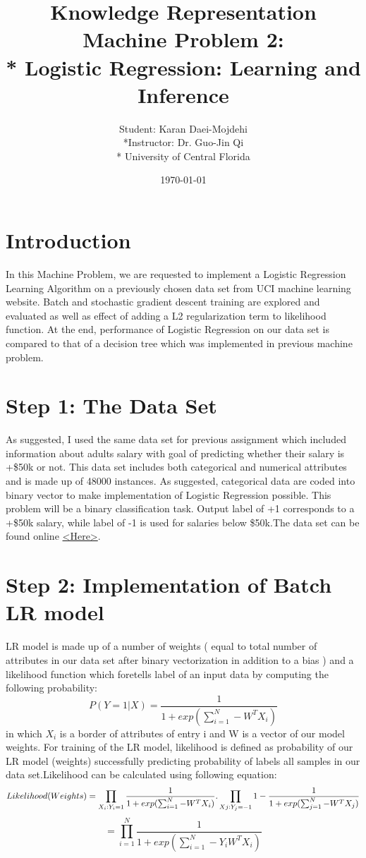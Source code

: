 \documentclass[a4paper,11pt]{article}
\author{Student: Karan Daei-Mojdehi\\*Instructor: Dr. Guo-Jin Qi\\* University of Central Florida}
\title{Knowledge Representation Machine Problem 2:\\* Logistic Regression: Learning and Inference }
\date{\today}
\begin{document}
\maketitle


\section*{Introduction}
In this Machine Problem, we are requested to implement a Logistic Regression Learning Algorithm on a previously chosen data set from UCI machine learning website. Batch and stochastic gradient descent training are explored and evaluated as well as effect of adding a L2 regularization term to likelihood function. At the end, performance of Logistic Regression on our data set is compared to that of a decision tree which was implemented in previous machine problem.

\section*{Step 1: The Data Set}
As suggested, I used the same data set for previous assignment which included information about adults salary with goal of predicting whether their salary is +\$50k or not. This data set includes both categorical and numerical attributes and is made up of 48000 instances. As suggested, categorical data are coded into binary vector to make implementation of Logistic Regression possible. This problem will be a binary classification task. Output label of +1 corresponds to a +\$50k salary, while label of -1 is used for salaries below \$50k.The data set can be found online  
\href{<https://archive.ics.uci.edu/ml/datasets/Adult.>}{<Here>}. 


\section*{Step 2: Implementation of Batch LR model}
LR model is made up of a number of weights ( equal to total number of attributes in our data set after binary vectorization in addition to a bias ) and a likelihood function which foretells label of an input data by computing the following probability:
\begin{equation}
 P(Y=1 | X ) = \frac{1}{1 + exp(\sum_{i=1}^{N}-W^TX_i)} 
\end{equation}
in which $X_i$ is a border of attributes of entry i and W is a vector of our model weights. For training of the LR model, likelihood is defined as probability of our LR model (weights) successfully predicting probability of labels all samples in our data set.Likelihood can be calculated using following equation:
\begin{equation}
 Likelihood( Weights )\newline
 =\prod_{X_i:Y_i=1}\frac{1}{1 + exp(\sum_{i=1}^{N}-W^TX_i)}  . \prod_{Xj:Y_j=-1}1-\frac{1}{1 + exp(\sum_{j=1}^{N}-W^TX_j)} \\
\end{equation}
\begin{equation}\label{something}
= \prod_{i=1}^{N} \frac{1}{1 + exp(\sum_{i=1}^{N}-Y_iW^TX_i)} 
\end{equation}
\end{document}
